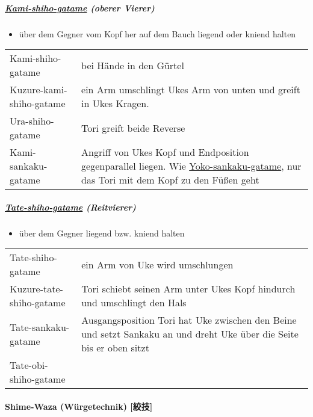 \documentclass[justified, a4paper, notitlepage, captions=tableheading, nobib]{tufte-handout}
\begin{document}
\subparagraph{\hyperref[org79c6e2f]{Kami-shiho-gatame} (oberer Vierer)}
\label{sec:orga71afba}

\begin{itemize}
\item über dem Gegner vom Kopf her auf dem Bauch liegend oder kniend halten
\end{itemize}

\begin{center}
\begin{tabular}{ll}
\label{org79c6e2f}Kami-shiho-gatame & bei Hände in den Gürtel\\
\label{orga74644b}Kuzure-kami-shiho-gatame & ein Arm umschlingt Ukes Arm von unten und greift in Ukes Kragen.\\
\label{orgb3eb622}Ura-shiho-gatame & Tori greift beide Reverse\\
\label{org5def404}Kami-sankaku-gatame & Angriff von Ukes Kopf und Endposition gegenparallel liegen. Wie \hyperref[org1b4d553]{Yoko-sankaku-gatame}, nur das Tori mit dem Kopf zu den Füßen geht\\
\end{tabular}
\end{center}

\subparagraph{\hyperref[org3d9c87f]{Tate-shiho-gatame} (Reitvierer)}
\label{sec:orgd706996}

\begin{itemize}
\item über dem Gegner liegend bzw. kniend halten
\end{itemize}

\begin{center}
\begin{tabular}{ll}
\label{org3d9c87f}Tate-shiho-gatame & ein Arm von Uke wird umschlungen\\
\label{org11c96d0}Kuzure-tate-shiho-gatame & Tori schiebt seinen Arm unter Ukes Kopf hindurch und umschlingt den Hals\\
\label{orgec558f5}Tate-sankaku-gatame & Ausgangsposition Tori hat Uke zwischen den Beine und setzt Sankaku an und dreht Uke über die Seite bis er oben sitzt\\
\label{orgb84fac8}Tate-obi-shiho-gatame & \\
\end{tabular}
\end{center}

\paragraph{Shime-Waza (Würgetechnik) [絞技] }
\label{sec:orgdd4e532}
\end{document}
